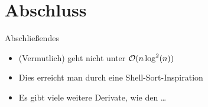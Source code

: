\section{Abschluss}
\begin{frame}{Abschließendes}
\begin{itemize}[<+(1)->]
    \itemsep12pt
    \item (Vermutlich) geht nicht unter \(\mathcal{O}(n \log^2(n))\)
    \item Dies erreicht man durch eine Shell-Sort-Inspiration
    \item Es gibt viele weitere Derivate, wie den \ldots
\end{itemize}
\end{frame}
\SidebarReset

